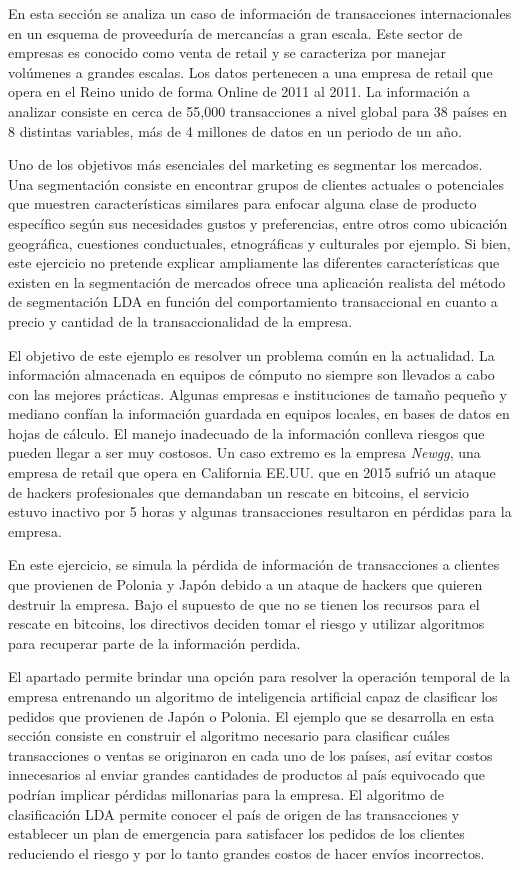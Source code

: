 \documentclass[letterpaper,12pt, spanish, oneside]{book} %
\begin{document}
En esta sección se analiza un caso de información de transacciones internacionales en un esquema de proveeduría de mercancías a gran escala. Este sector de empresas es conocido como venta de retail y se caracteriza por manejar volúmenes a grandes escalas. Los datos pertenecen a una empresa de retail que opera en el Reino unido de forma Online de 2011 al 2011. La información a analizar consiste en cerca de 55,000 transacciones a nivel global para 38 países en 8 distintas variables, más de 4 millones de datos en un periodo de un año.

Uno de los objetivos más esenciales del marketing es segmentar los mercados. Una segmentación consiste en encontrar grupos de clientes actuales o potenciales que muestren características similares para enfocar alguna clase de producto específico según sus necesidades gustos y preferencias, entre otros como ubicación geográfica, cuestiones conductuales, etnográficas y culturales por ejemplo. Si bien, este ejercicio no pretende explicar ampliamente las diferentes características que existen en la segmentación de mercados ofrece una aplicación realista del método de segmentación LDA en función del comportamiento transaccional en cuanto a precio y cantidad de la transaccionalidad de la empresa.

El objetivo de este ejemplo es resolver un problema común en la actualidad. La información almacenada en equipos de cómputo no siempre son llevados a cabo con las mejores prácticas. Algunas empresas e instituciones de tamaño pequeño y mediano confían la información guardada en equipos locales, en bases de datos en hojas de cálculo. El manejo inadecuado de la información conlleva riesgos que pueden llegar a ser muy costosos. Un caso extremo es la empresa \textit{Newgg}, una empresa de retail que opera en California EE.UU. que en 2015 sufrió un ataque de hackers profesionales que demandaban un rescate en bitcoins, el servicio estuvo inactivo por 5 horas y algunas transacciones resultaron en pérdidas para la empresa. 

En este ejercicio, se simula la pérdida de información de transacciones a clientes que provienen de Polonia y Japón debido a un ataque de hackers que quieren destruir la empresa. Bajo el supuesto de que no se tienen los recursos para el rescate en bitcoins, los directivos deciden tomar el riesgo y utilizar algoritmos para recuperar parte de la información perdida.

El apartado permite brindar una opción para resolver la operación temporal de la empresa entrenando un algoritmo de inteligencia artificial capaz de clasificar los pedidos que provienen de Japón o Polonia. El ejemplo que se desarrolla en esta sección consiste en construir el algoritmo necesario para clasificar cuáles transacciones o ventas se originaron en cada uno de los países, así evitar costos innecesarios al enviar grandes cantidades de productos al país equivocado que podrían implicar pérdidas millonarias para la empresa. El algoritmo de clasificación LDA permite conocer el país de origen de las transacciones y establecer un plan de emergencia para satisfacer los pedidos de los clientes reduciendo el riesgo y por lo tanto grandes costos de hacer envíos incorrectos.
\end{document}
